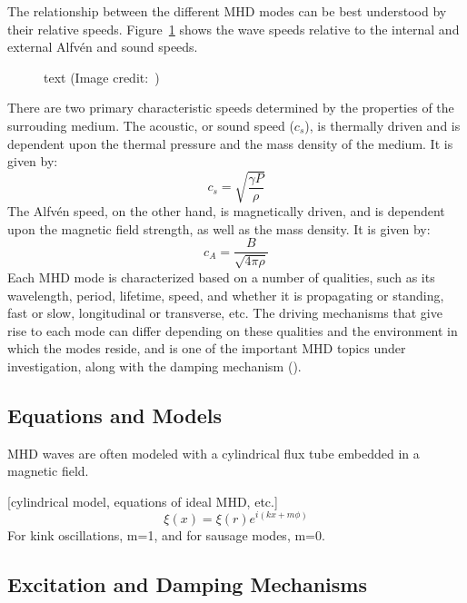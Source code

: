 \documentclass[preprint2]{aastex}
\begin{document}
The relationship between the different MHD modes can be best understood
by their relative speeds. Figure~\ref{speeds} shows the wave speeds relative
to the internal and external Alfv\'en and sound speeds.

\begin{figure}[ht]
    \caption{text (Image credit:~\cite{Nak})}
    \label{speeds}
\end{figure}

There are two primary characteristic speeds determined by the properties
of the surrouding medium.
The acoustic, or sound speed ($c_{s}$), is thermally driven and is dependent
upon the thermal pressure and the mass density of the medium.
It is given by:
\begin{equation}\label{sound_speed}
    c_s = \sqrt{\frac{\gamma{P}}{\rho}}
\end{equation}
The Alfv\'en speed, on the other hand, is magnetically driven, and is
dependent upon the magnetic field strength, as well as the mass density.
It is given by:
\begin{equation}\label{Alfven_speed}
    c_A = \frac{B}{\sqrt{4\pi\rho}}
\end{equation}
Each MHD mode is characterized based on a number of qualities, such
as its wavelength, period, lifetime, speed, and
whether it is propagating or standing, fast or slow, longitudinal
or transverse, etc. The driving mechanisms that give rise to each mode
can differ depending on these qualities and the environment in which
the modes reside, and is one of the important MHD topics under investigation,
along with the damping mechanism (\cite{kink_1}).

\subsection{Equations and Models}
MHD waves are often modeled with a cylindrical flux tube embedded
in a magnetic field.

[cylindrical model, equations of ideal MHD, etc.]
\begin{equation}
 \xi(x) = \xi(r)e^{i(kx+m\phi)}
\end{equation}
For kink oscillations, m=1, and for sausage modes, m=0.

\subsection{Excitation and Damping Mechanisms}
\end{document}

